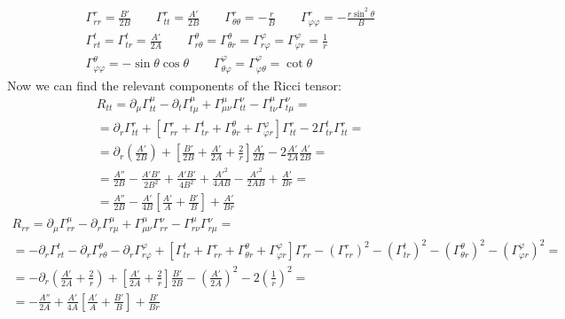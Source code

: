 \documentclass{article}
\begin{document}
\begin{equation}
\begin{gathered}
    \Gamma^{r}_{rr} = \frac{B'}{2B}
    \qquad
    \Gamma^{r}_{tt} = \frac{A'}{2B}
    \qquad
    \Gamma^{r}_{\theta\theta} = -\frac{r}{B}
    \qquad
    \Gamma^{r}_{\varphi\varphi} = -\frac{r\sin^2\theta}{B}
    \\
    \Gamma^{t}_{rt} = \Gamma^{t}_{tr} = \frac{A'}{2A}
    \qquad
    \Gamma^{\theta}_{r\theta} = \Gamma^{\theta}_{\theta r} = 
    \Gamma^{\varphi}_{r\varphi} = \Gamma^{\varphi}_{\varphi r} = \frac{1}{r}
    \\
    \Gamma^{\theta}_{\varphi\varphi} = -\sin\theta\cos\theta
    \qquad
    \Gamma^{\varphi}_{\theta\varphi} = \Gamma^{\varphi}_{\varphi\theta} = \cot\theta
\end{gathered}
\end{equation}
Now we can find the relevant components of the Ricci tensor:
\begin{equation}
\begin{gathered}
    R_{tt} =
    \partial_\mu \Gamma^\mu_{tt} - \partial_t \Gamma^{\mu}_{t\mu} + \Gamma^{\mu}_{\mu\nu}\Gamma^{\nu}_{tt} - \Gamma^{\mu}_{t\nu}\Gamma^{\nu}_{t\mu} = \\ =
    \partial_r \Gamma^{r}_{tt} + \left[\Gamma^{r}_{rr} + \Gamma^{t}_{tr} + \Gamma^{\theta}_{\theta r} + \Gamma^{\varphi}_{\varphi r}\right]\Gamma^{r}_{tt} - 2\Gamma^{t}_{tr}\Gamma^{r}_{tt} = \\ =
    \partial_r \left(\frac{A'}{2B}\right) + \left[\frac{B'}{2B} + \frac{A'}{2A} + \frac{2}{r}\right]\frac{A'}{2B} - 2\frac{A'}{2A}\frac{A'}{2B} = \\ =
    \frac{A''}{2B} - \frac{A'B'}{2B^2} + \frac{A'B'}{4B^2} + \frac{A'^2}{4AB} - \frac{A'^2}{2AB} + \frac{A'}{Br} = \\ =
    \frac{A''}{2B} - \frac{A'}{4B}\left[\frac{A'}{A} + \frac{B'}{B}\right] + \frac{A'}{Br}
\end{gathered}
\end{equation}
\begin{equation}
\begin{gathered}
    R_{rr} = \partial_\mu \Gamma^\mu_{rr} - \partial_r \Gamma^{\mu}_{r\mu} + \Gamma^{\mu}_{\mu\nu}\Gamma^{\nu}_{rr} - \Gamma^{\mu}_{r\nu}\Gamma^{\nu}_{r\mu} = \\ =
    - \partial_r \Gamma^{t}_{rt}
    - \partial_r \Gamma^{\theta}_{r\theta}
    - \partial_r \Gamma^{\varphi}_{r\varphi}
    + \left[\Gamma^{t}_{tr} 
    + \Gamma^{r}_{rr}
    + \Gamma^{\theta}_{\theta r}
    + \Gamma^{\varphi}_{\varphi r}\right]\Gamma^{r}_{rr} 
    - (\Gamma^{r}_{rr})^2
    - (\Gamma^{t}_{tr})^2
    - (\Gamma^{\theta}_{\theta r})^2
    - (\Gamma^{\varphi}_{\varphi r})^2
    = \\ =
    -\partial_r\left(\frac{A'}{2A} + \frac{2}{r}\right) + \left[
        \frac{A'}{2A} + \frac{2}{r}
    \right]\frac{B'}{2B} - \left(\frac{A'}{2A}\right)^2 - 2\left(\frac{1}{r}\right)^2
    = \\ =
    -\frac{A''}{2A} + \frac{A'}{4A}\left[\frac{A'}{A} + \frac{B'}{B}\right] + \frac{B'}{Br}
\end{gathered}
\end{equation}
\end{document}
